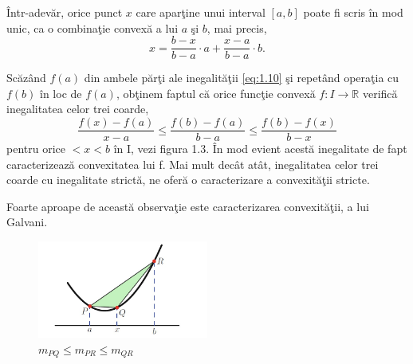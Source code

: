 \documentclass[a4paper,12pt,oneside]{report}
\begin{document}
\^{I}ntr-adev\u{a}r,  orice punct \(x\) care apar\c{t}ine unui interval \(\left [ a,b \right ]\) poate fi scris \^{i}n mod unic, ca o combina\c{t}ie convex\u{a} a lui \(a\) \c{s}i \(b\), mai precis,
\begin{displaymath}
    x = \frac{b - x}{b - a} \cdot a  + \frac{x- a}{b - a}\cdot b.
\end{displaymath}

Sc\u{a}z\^{a}nd \(f\left ( a \right )\) din ambele p\u{a}r\c{t}i ale inegalit\u{a}\c{t}ii \ref{eq:1.10} \c{s}i repet\^{a}nd opera\c{t}ia cu \(f\left ( b \right )\) \^{i}n loc de \(f\left ( a \right )\), ob\c{t}inem faptul c\u{a} orice func\c{t}ie convex\u{a} \(f : I \rightarrow \mathbb{R}\) verific\u{a} inegalitatea celor trei coarde,
\begin{displaymath}
   \frac{f\left ( x \right ) - f\left ( a \right )}{x-a}\leq \frac{f\left ( b \right )- f\left ( a \right )}{b-a}\leq \frac{f\left ( b \right ) - f\left ( x \right )}{b-x} \label{eq:1.12} \tag{1.12}
\end{displaymath}
pentru orice \(< x< b\) \^{i}n I, vezi figura 1.3. \^{I}n mod evient acest\u{a} inegalitate de fapt caracterizeaz\u{a} convexitatea lui f. Mai mult dec\^{a}t at\^{a}t, inegalitatea celor trei coarde cu inegalitate strict\u{a}, ne ofer\u{a} o caracterizare a convexit\u{a}\c{t}ii stricte. 

Foarte aproape de aceast\u{a} observa\c{t}ie este caracterizarea convexit\u{a}\c{t}ii, a lui Galvani.

\begin{figure}[htbp]
	\centering
	\includegraphics[width=0.5\textwidth]{fig1.3.png}
	\caption{ \(m_{PQ} \leq m_{PR}\leq  m_{QR}\) }
\end{figure}
\end{document}
